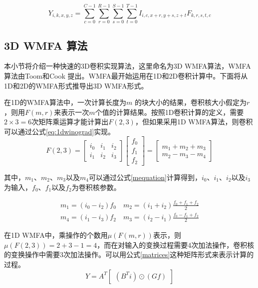 \begin{equation} \label{eq:3dcnn}
Y_{i,k,x,y,z} = \sum_{c=0}^{C-1}\sum_{r=0}^{R-1}\sum_{s=0}^{S-1}\sum_{t=0}^{T-1}I_{i,c,x+r,y+s,z+t}F_{k,r,s,t,c}
\end{equation} 

\subsection{3D WMFA 算法}
本小节将介绍一种快速的3D卷积实现算法，这里命名为3D WMFA算法，WMFA算法由Toom和Cook 提出。WMFA最开始运用在1D和2D卷积计算中。下面将从1D和2D的WMFA形式推导出3D WMFA形式。

在1D的WMFA算法中，一次计算长度为$m$ 的块大小的结果，卷积核大小假定为$r$，则用$F(m,r)$来表示一次$m$个值的计算结果。按照1D卷积计算的定义，需要$2\times 3=6$次矩阵乘运算才能计算出$F(2,3)$，但如果采用1D WMFA算法，则卷积可以通过公式\ref{eq:1dwinograd}实现。
\begin{equation} \label{eq:1dwinograd}
F(2,3) = \begin{bmatrix}
i_0 & i_1 & i_2 \\
i_1 & i_2 & i_3 
\end{bmatrix}
\begin{bmatrix}
f_0 \\
f_1 \\
f_2
\end{bmatrix}
= \begin{bmatrix}
m_1 + m_2 + m_3 \\
m_2 - m_3 - m_4
\end{bmatrix}
\end{equation} 

其中，$m_1$、$m_2$、$m_3$以及$m_4$可以通过公式\ref{mequation}计算得到，$i_0$、$i_1$、$i_2$以及$i_3$为输入，$f_0$、$f_1$以及$f_2$为卷积核参数。

\begin{equation}
\label{mequation}
\begin{split}
m_1 = (i_0-i_2)f_0 	 \quad	m_2 = (i_1+i_2)\frac{f_0+f_1+f_2}{2} \\
m_4 = (i_1-i_3)f_2 	 \quad	m_3 = (i_2-i_1)\frac{f_0-f_1+f_2}{2}
\end{split}
\end{equation}

在1D WMFA中，乘操作的个数用$\mu(F(m,r))$表示，则$\mu(F(2,3))  = 2+3-1=4$，而在对输入的变换过程需要4次加法操作，卷积核的变换操作中需要3次加法操作。可以用公式\ref{matrices}这种矩阵形式来表示计算的过程。
\begin{equation} \label{matrices}
Y = A^T\begin{bmatrix}
(B^Ti)\odot{(Gf)}
\end{bmatrix}
\end{equation}

